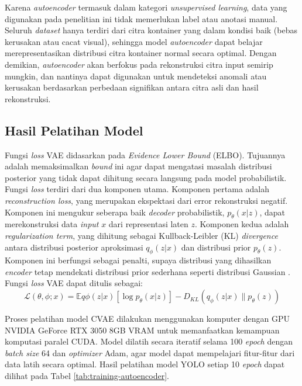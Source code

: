 Karena \textit{autoencoder} termasuk dalam kategori \textit{unsupervised
learning}, data yang digunakan pada penelitian ini tidak memerlukan
label atau anotasi manual. Seluruh \textit{dataset} hanya terdiri dari citra
kontainer yang dalam kondisi baik (bebas kerusakan atau cacat
visual), sehingga model \textit{autoencoder} dapat belajar merepresentasikan
distribusi citra kontainer normal secara optimal. Dengan demikian,
\textit{autoencoder} akan berfokus pada rekonstruksi citra input semirip
mungkin, dan nantinya dapat digunakan untuk mendeteksi anomali atau
kerusakan berdasarkan perbedaan signifikan antara citra asli dan
hasil rekonstruksi.

\vspace{1em}

\subsection{Hasil Pelatihan Model}

Fungsi \textit{loss} VAE didasarkan pada \textit{Evidence Lower
Bound} (ELBO). Tujuannya
adalah memaksimalkan \textit{bound} ini agar dapat mengatasi masalah
distribusi posterior yang tidak dapat dihitung secara langsung pada
model probabilistik. Fungsi \textit{loss} terdiri dari dua komponen utama.
Komponen pertama adalah \textit{reconstruction loss}, yang merupakan
ekspektasi dari error rekonstruksi negatif. Komponen ini mengukur
seberapa baik \textit{decoder} probabilistik, $p_\theta(x|z)$, dapat
merekonstruksi data \textit{input} $x$ dari representasi laten $z$. Komponen
kedua adalah \textit{regularization term}, yang dihitung sebagai
Kullback-Leibler (KL) \textit{divergence} antara distribusi posterior
aproksimasi $q_\phi(z|x)$ dan distribusi prior $p_\theta(z)$.
Komponen ini berfungsi sebagai penalti, supaya distribusi yang
dihasilkan \textit{encoder} tetap mendekati distribusi prior sederhana
seperti distribusi Gaussian \citep{26}. Fungsi \textit{loss}
VAE dapat ditulis sebagai:
\begin{equation}
  \mathcal{L}(\theta, \phi; x) = \mathbb{E}{q\phi(z|x)}[\log
  p_\theta(x|z)] - D_{KL}(q_\phi(z|x) \parallel p_\theta(z))
\end{equation}

Proses pelatihan model CVAE dilakukan
menggunakan komputer dengan GPU NVIDIA GeForce RTX 3050 8GB VRAM
untuk memanfaatkan kemampuan komputasi paralel CUDA. Model dilatih
secara iteratif selama 100 \textit{epoch} dengan
\textit{batch size} 64
dan \textit{optimizer} Adam, agar model dapat mempelajari fitur-fitur dari
data latih secara
optimal. Hasil pelatihan model YOLO setiap 10 \textit{epoch} dapat dilihat
pada Tabel \ref{tab:training-autoencoder}.

